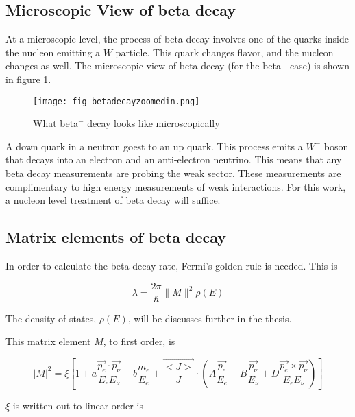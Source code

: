 \documentclass[../MaxHughesThesis.tex]{subfiles}
\begin{document}
\subsection{Microscopic View of beta decay}
At a microscopic level, the process of beta decay involves one of the quarks inside the nucleon emitting a $W$ particle.
This quark changes flavor, and the nucleon changes as well. 
The microscopic view of beta decay (for the beta$^{-}$ case) is shown in figure \ref{fig:betadecaymicro}.

\begin{figure}[!htb]
	\centerline{\texttt{[image: fig\_betadecayzoomedin.png]}}
	\caption{What beta$^{-}$ decay looks like microscopically}
	\label{fig:betadecaymicro}
\end{figure}

A down quark in a neutron goest to an up quark.
This process emits a $W^{-}$ boson that decays into an electron and an anti-electron neutrino.
This means that any beta decay measurements are probing the weak sector. 
These measurements are complimentary to high energy measurements of weak interactions.
For this work, a nucleon level treatment of beta decay will suffice.  

\subsection{Matrix elements of beta decay}
In order to calculate the beta decay rate, Fermi's golden rule is needed.
This is %

\begin{equation}
	\lambda = \frac{2\pi}{\hbar}\|M\|^{2}\rho(E)
	\label{eq:fgr}
\end{equation}

The density of states, $\rho(E)$, will be discusses further in the thesis. 

This matrix element $M$, to first order, is \cite{Gon19} %

\begin{equation}
	|M|^{2} = \xi [1 + a \frac{\vec{p_{e}} \cdot \vec{p_{\nu}}} {E_{e} E_{\nu}}  +  b \frac{m_{e}}{E_{e}} + \frac{\vec{<J>}}{J} \cdot (A \frac{ \vec{p_{e}} }{E_{e}} + B \frac{\vec{p_{\nu}}}{E_{\nu}} + D \frac{\vec{p_{e}} \times \vec{p_{\nu}}}{E_{e} E_{\nu}})]
	\label{eq:matrixelement}
\end{equation}

$\xi$ is written out to linear order is %
 
\end{document}

